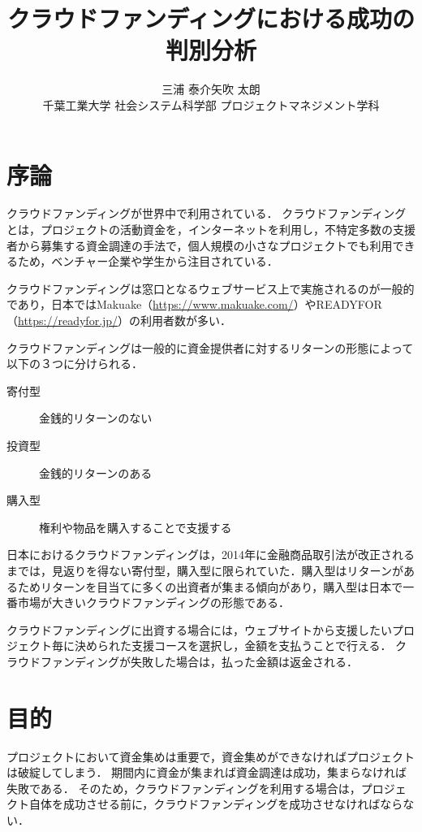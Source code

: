 \documentclass[uplatex,twocolumn]{jsarticle}
\title{\vspace{-10mm}クラウドファンディングにおける成功の判別分析\footnotemark[0]}%
\author{\large{三浦 泰介\footnotemark[2]\qquad 矢吹 太朗}\\千葉工業大学 社会システム科学部 プロジェクトマネジメント学科\footnotemark[3]}%
\date{}
\begin{document}
\twocolumn[\maketitle]

\begingroup
\def\thefootnote{\fnsymbol{footnote}}
\endgroup

\section{序論}
クラウドファンディング\cite{wiki}が世界中で利用されている．\cite{kaihatu}
クラウドファンディングとは，プロジェクトの活動資金を，インターネットを利用し，不特定多数の支援者から募集する資金調達の手法で，個人規模の小さなプロジェクトでも利用できるため，ベンチャー企業や学生から注目されている．

クラウドファンディングは窓口となるウェブサービス上で実施されるのが一般的であり，日本ではMakuake（\url{https://www.makuake.com/}）やREADYFOR（\url{https://readyfor.jp/}）の利用者数が多い．

クラウドファンディングは一般的に資金提供者に対するリターンの形態によって以下の３つに分けられる．

\begin{description}
\item[寄付型] 金銭的リターンのない
\item[投資型] 金銭的リターンのある
\item[購入型] 権利や物品を購入することで支援する
\end{description}

日本におけるクラウドファンディングは，2014年に金融商品取引法が改正されるまで\cite{kisei}は，見返りを得ない寄付型，購入型に限られていた．購入型はリターンがあるためリターンを目当てに多くの出資者が集まる傾向があり，購入型は日本で一番市場が大きいクラウドファンディングの形態である．

クラウドファンディングに出資する場合には，ウェブサイトから支援したいプロジェクト毎に決められた支援コースを選択し，金額を支払うことで行える．
クラウドファンディングが失敗した場合は，払った金額は返金される．





\section{目的}
プロジェクトにおいて資金集めは重要で，資金集めができなければプロジェクトは破綻してしまう．
期間内に資金が集まれば資金調達は成功，集まらなければ失敗である．
そのため，クラウドファンディングを利用する場合は，プロジェクト自体を成功させる前に，クラウドファンディングを成功させなければならない．
\end{document}
